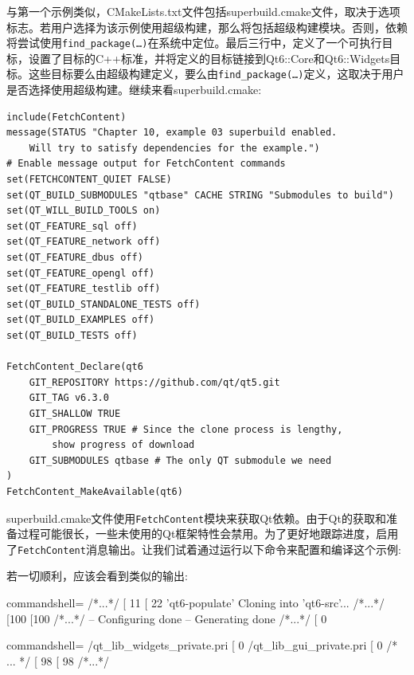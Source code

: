 与第一个示例类似，CMakeLists.txt文件包括superbuild.cmake文件，取决于选项标志。若用户选择为该示例使用超级构建，那么将包括超级构建模块。否则，依赖将尝试使用\texttt{find\_package(…)}在系统中定位。最后三行中，定义了一个可执行目标，设置了目标的C++标准，并将定义的目标链接到Qt6::Core和Qt6::Widgets目标。这些目标要么由超级构建定义，要么由\texttt{find\_package(…)}定义，这取决于用户是否选择使用超级构建。继续来看superbuild.cmake:

\begin{lstlisting}[style=styleCMake]
include(FetchContent)
message(STATUS "Chapter 10, example 03 superbuild enabled.
	Will try to satisfy dependencies for the example.")
# Enable message output for FetchContent commands
set(FETCHCONTENT_QUIET FALSE)
set(QT_BUILD_SUBMODULES "qtbase" CACHE STRING "Submodules to build")
set(QT_WILL_BUILD_TOOLS on)
set(QT_FEATURE_sql off)
set(QT_FEATURE_network off)
set(QT_FEATURE_dbus off)
set(QT_FEATURE_opengl off)
set(QT_FEATURE_testlib off)
set(QT_BUILD_STANDALONE_TESTS off)
set(QT_BUILD_EXAMPLES off)
set(QT_BUILD_TESTS off)

FetchContent_Declare(qt6
	GIT_REPOSITORY https://github.com/qt/qt5.git
	GIT_TAG v6.3.0
	GIT_SHALLOW TRUE
	GIT_PROGRESS TRUE # Since the clone process is lengthy,
		show progress of download
	GIT_SUBMODULES qtbase # The only QT submodule we need
)
FetchContent_MakeAvailable(qt6)
\end{lstlisting}

superbuild.cmake文件使用\texttt{FetchContent}模块来获取Qt依赖。由于Qt的获取和准备过程可能很长，一些未使用的Qt框架特性会禁用。为了更好地跟踪进度，启用了\texttt{FetchContent}消息输出。让我们试着通过运行以下命令来配置和编译这个示例:


若一切顺利，应该会看到类似的输出:

\begin{tcblisting}{commandshell={}}
/*...*/
[ 11%
[ 22%
  'qt6-populate'
Cloning into 'qt6-src'...
/*...*/
[100%
[100%
/*...*/
-- Configuring done
-- Generating done
/*...*/
[ 0%
\end{tcblisting}
\begin{tcblisting}{commandshell={}}
  /qt_lib_widgets_private.pri
[ 0%
/qt_lib_gui_private.pri
[ 0%
/* ... */
[ 98%
[ 98%
/*...*/
\end{tcblisting}

